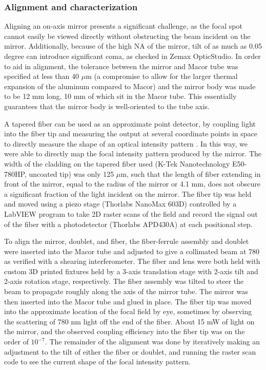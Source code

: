 \subsubsection{Alignment and characterization}

Aligning an on-axis mirror presents a significant challenge, as the focal spot cannot easily be viewed directly without obstructing the beam incident on the mirror. Additionally, because of the high NA of the mirror, tilt of as much as 0.05 degree can introduce significant coma, as checked in Zemax OpticStudio. In order to aid in alignment, the tolerance between the mirror and Macor tube was specified at less than 40 $\mu \mathrm{m}$ (a compromise to allow for the larger thermal expansion of the aluminum compared to Macor) and the mirror body was made to be 12 mm long, 10 mm of which sit in the Macor tube. This essentially guarantees that the mirror body is well-oriented to the tube axis. 

A tapered fiber can be used as an approximate point detector, by coupling light into the fiber tip and measuring the output at several coordinate points in space to directly measure the shape of an optical intensity pattern \cite{TOLEDOCROW1995,RHODES1998}. In this way, we were able to directly map the focal intensity pattern produced by the mirror. The width of the cladding on the tapered fiber used (K-Tek Nanotechnology E50-780HP, uncoated tip) was only 125 $\mu \mathrm{m}$, such that the length of fiber extending in front of the mirror, equal to the radius of the mirror or 4.1 mm, does not obscure a significant fraction of the light incident on the mirror. The fiber tip was held and moved using a piezo stage (Thorlabs NanoMax 603D) controlled by a LabVIEW program to take 2D raster scans of the field and record the signal out of the fiber with a photodetector (Thorlabs APD430A) at each positional step. 

To align the mirror, doublet, and fiber, the fiber-ferrule assembly and doublet were inserted into the Macor tube and adjusted to give a collimated beam at 780 as verified with a shearing interferometer. The fiber and lens were both held with custom 3D printed fixtures held by a 3-axis translation stage with 2-axis tilt and 2-axis rotation stage, respectively. The fiber assembly was tilted to steer the beam to propagate roughly along the axis of the mirror tube. The mirror was then inserted into the Macor tube and glued in place. The fiber tip was moved into the approximate location of the focal field by eye, sometimes by observing the scattering of 780 nm light off the end of the fiber. About 15 mW of light on the mirror, and the observed coupling efficiency into the fiber tip was on the order of $10^{-7}$. The remainder of the alignment was done by iteratively making an adjustment to the tilt of either the fiber or doublet, and running the raster scan code to see the current shape of the focal intensity pattern.

